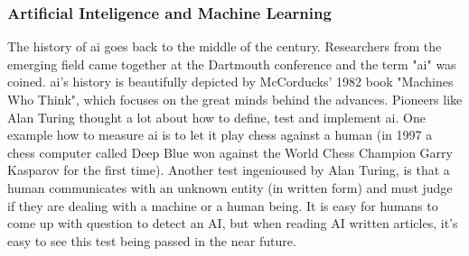 \subsubsection{Artificial Inteligence and Machine Learning}
The history of \gls{ai} goes back to the middle of the  century. 
Researchers from the emerging field came together at the Dartmouth conference and the term "\gls{ai}" was coined\cite{McCarthy1955}. 
\Gls{ai}'s  history is beautifully depicted by McCorducks' 1982 book "Machines Who Think"\cite{McCorduck1982,Apter1982}, which focuses on the great minds behind the advances.
Pioneers like Alan Turing thought a lot about how to define, test and implement \gls{ai}\cite{Howard2019}. 
One example how to measure \gls{ai} is to let it play chess against a human\cite{Silver2017} 
(in 1997 a chess computer called Deep Blue won against the World Chess Champion Garry Kasparov for the first time\cite{Feng1999}).
Another test ingenioused by Alan Turing, is that a human communicates with an unknown entity (in written form) and must judge if they are dealing with a machine or a human being. 
It is easy for humans to come up with question to detect an AI, 
but when reading AI written articles\cite{gpt2020}, it's easy to see this test being passed in the near future. 

